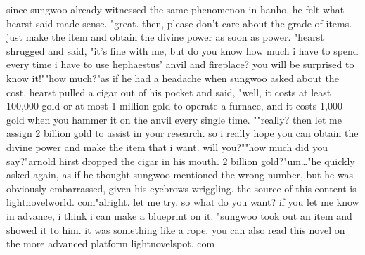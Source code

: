 since sungwoo already witnessed the same phenomenon in hanho, he felt what hearst said made sense.
 "great.
 then, please don't care about the grade of items.
 just make the item and obtain the divine power as soon as power.
"hearst shrugged and said, "it's fine with me, but do you know how much i have to spend every time i have to use hephaestus' anvil and fireplace? you will be surprised to know it!""how much?"as if he had a headache when sungwoo asked about the cost, hearst pulled a cigar out of his pocket and said, "well, it costs at least 100,000 gold or at most 1 million gold to operate a furnace, and it costs 1,000 gold when you hammer it on the anvil every single time.
""really? then let me assign 2 billion gold to assist in your research.
 so i really hope you can obtain the divine power and make the item that i want.
 will you?""how much did you say?"arnold hirst dropped the cigar in his mouth.
 2 billion gold?"um…"he quickly asked again, as if he thought sungwoo mentioned the wrong number, but he was obviously embarrassed, given his eyebrows wriggling.
 the source of this content is lightnovelworld.
com"alright.
 let me try.
 so what do you want? if you let me know in advance, i think i can make a blueprint on it.
"sungwoo took out an item and showed it to him.
 it was something like a rope.
 you can also read this novel on the more advanced platform lightnovelspot.
com

 